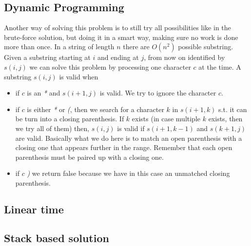 

\subsection{Dynamic Programming}
\label{valid_parenthesis:sec:dp}
Another way of solving this problem is to still try all possibilities like in the brute-force solution, but doing it in a smart way, making sure no work is done more than once. In a string of length $n$ there are $O(n^2)$ possible substring. 
Given a substring starting at $i$ and ending at $j$, from now on identified by $s(i,j)$ we can solve this problem by processing one character $c$ at the time. A substring $s(i,j)$ is valid when
\begin{itemize}
	\item if $c$ is an \textit{*} and $s(i+1,j)$ is valid. We try to ignore the character $c$.
	\item if $c$ is either \textit{*} or \textit{(}, then we search for a character $k$ in $s(i+1,k)$ s.t. it can be turn into a closing parenthesis. If $k$ exists (in case multiple $k$ exists, then we try all of them) then, $s(i,j)$ is valid if $s(i+1,k-1)$ and $s(k+1,j)$ are valid. Basically what we do here is to match an open parenthesis with a closing one that appears further in the range. Remember that each open parenthesis must be paired up with a closing one.
	\item if $c$ \textit{)} we return false because we have in this case an unmatched closing parenthesis.
\end{itemize}



\subsection{Linear time}
\label{valid_parenthesis:sec:linear}



\subsection{Stack based solution}
\label{valid_parenthesis:sec:twostacks}





